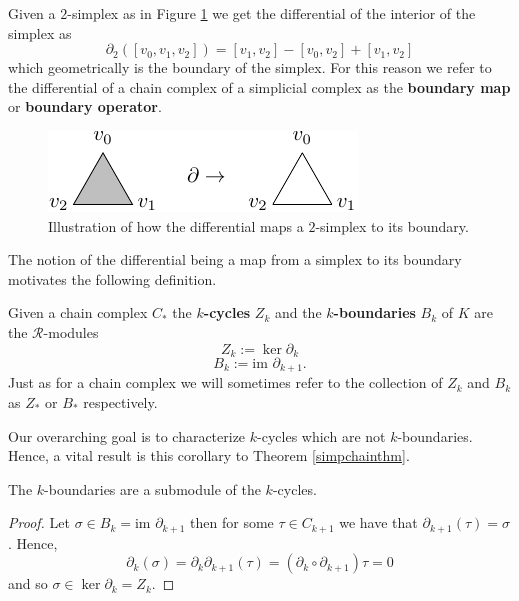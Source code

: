 \begin{example}
Given a $2$-simplex as in Figure \ref{2simplex} we get the differential of the interior of the simplex as \[\partial_{2}([v_{0},v_{1},v_{2}])=[v_{1},v_{2}]-[v_{0},v_{2}]+[v_{1},v_{2}]\] which geometrically is the boundary of the simplex. For this reason we refer to the differential of a chain complex of a simplicial complex as the \textbf{boundary map} or \textbf{boundary operator}.
\begin{figure}[ht]
  \centering
  \includegraphics[scale=2]{partialtri.pdf}
  \caption{\label{2simplex} Illustration of how the differential maps a $2$-simplex to its boundary.}
\end{figure}
\end{example}
The notion of the differential being a map from a simplex to its boundary motivates the following definition.
\begin{definition}
  Given a chain complex $C_{*}$ the \textbf{$k$-cycles} $Z_{k}$  and the \textbf{$k$-boundaries} $B_{k}$ of $K$ are the $\mathcal{R}$-modules
  \[ Z_{k} := \ker \partial_{k}\]
  \[ B_{k} := \textrm{im } \partial_{k+1}.\]
  Just as for a chain complex we will sometimes refer to the collection of $Z_{k}$ and $B_{k}$ as $Z_{*}$ or $B_{*}$ respectively.
\end{definition}
Our overarching goal is to characterize $k$-cycles which are not $k$-boundaries. Hence, a vital result is this corollary to Theorem \ref{simpchainthm}.

\begin{corollary}
  The $k$-boundaries are a submodule of the $k$-cycles.
\end{corollary}


\begin{proof}
Let $\sigma \in B_{k} = \textrm{im } \partial_{k+1}$ then for some $\tau \in C_{k+1}$ we have that $\partial_{k+1}(\tau)=\sigma$. Hence,
\[ \partial_{k}(\sigma) = \partial_{k} \partial_{k+1}(\tau) = (\partial_{k} \circ \partial_{k+1}) \tau = 0\]
and so $\sigma \in \ker \partial_{k} = Z_{k}$.
\end{proof}

